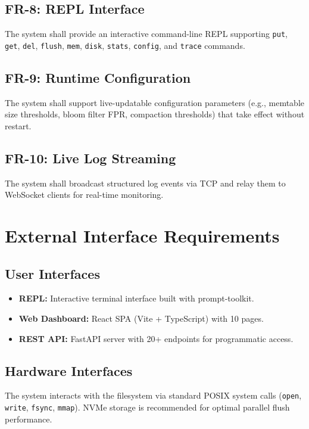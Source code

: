 \documentclass[oneside,a4paper,12pt]{book}
\begin{document}
\subsection{FR-8: REPL Interface}
The system shall provide an interactive command-line REPL supporting \texttt{put}, \texttt{get}, \texttt{del}, \texttt{flush}, \texttt{mem}, \texttt{disk}, \texttt{stats}, \texttt{config}, and \texttt{trace} commands.

\subsection{FR-9: Runtime Configuration}
The system shall support live-updatable configuration parameters (e.g., memtable size thresholds, bloom filter FPR, compaction thresholds) that take effect without restart.

\subsection{FR-10: Live Log Streaming}
The system shall broadcast structured log events via TCP and relay them to WebSocket clients for real-time monitoring.

\section{External Interface Requirements}

\subsection{User Interfaces}
\begin{itemize}[leftmargin=2em]
    \item \textbf{REPL:} Interactive terminal interface built with prompt-toolkit.
    \item \textbf{Web Dashboard:} React SPA (Vite + TypeScript) with 10 pages.
    \item \textbf{REST API:} FastAPI server with 20+ endpoints for programmatic access.
\end{itemize}

\subsection{Hardware Interfaces}
The system interacts with the filesystem via standard POSIX system calls (\texttt{open}, \texttt{write}, \texttt{fsync}, \texttt{mmap}). NVMe storage is recommended for optimal parallel flush performance.
\end{document}
